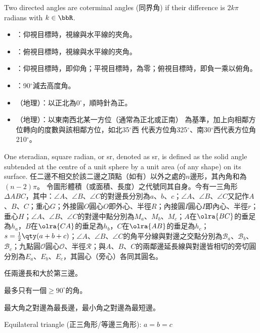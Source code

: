 \documentclass[a4paper,12pt]{report}
\begin{document}
Two directed angles are coterminal angles (同界角) if their difference is $2k\pi$ radians with $k\in\bbR$.
\begin{itemize}
\item {}：仰視目標時，視線與水平線的夾角。
\item {}：俯視目標時，視線與水平線的夾角。
\item {}：仰視目標時，即仰角；平視目標時，為零；俯視目標時，即負一乘以俯角。
\item {}：90$^{\circ}$減去高度角。
\item {}（地理）：以正北為0$^\circ$，順時針為正。
\item {}（地理）：以東南西北某一方位（通常為正北或正南） 為基準，加上向相鄰方位轉向的度數與該相鄰方位，如北35$^\circ$西 代表方位角325$^\circ$、南30$^\circ$西代表方位角210$^\circ$。
\end{itemize}
One steradian, square radian, or sr, denoted as sr, is defined as the solid angle subtended at the centre of a unit sphere by a unit area (of any shape) on its surface.
任二邊不相交於該二邊之頂點（如有）以外之處的$n$邊形，其內角和為$(n-2)\pi$。
令圖形體積（或面積、長度）之代號同其自身。今有一三角形$\Delta ABC$，其中：$\angle A$、$\angle B$、$\angle C$的對邊長分別為$a$、$b$、$c$；$\angle A$、$\angle B$、$\angle C$又記作$A$、$B$、$C$；重心$G$；外接圓$O$圓心$O$即外心、半徑$R$；內接圓$I$圓心$I$即內心、半徑$r$；垂心$H$；$\angle A$、$\angle B$、$\angle C$的對邊中點分別為$M_a$、$M_b$、$M_c$；$A$在$\olra{BC}$的垂足為$h_a$，$B$在$\olra{CA}$的垂足為$h_b$，$C$在$\olra{AB}$的垂足為$h_c$；$s=\frac{1}{2}\qty(a+b+c)$；$\angle A$、$\angle B$、$\angle C$的角平分線與對邊之交點分別為$\mathscr{B}_a$、$\mathscr{B}_b$、$\mathscr{B}_c$；九點圓$\mathscr{O}$圓心$\mathscr{O}$、半徑$\mathscr{R}$；與$A$、$B$、$C$的兩鄰邊延長線與對邊皆相切的旁切圓分別為$E_a$、$E_b$、$E_c$，其圓心（旁心）各同其圓名。
\bit
\item 任兩邊長和大於第三邊。
\item 最多只有一個$\geq 90^\circ$的角。
\item 最大角之對邊為最長邊，最小角之對邊為最短邊。
\eit
{}
\bit
\item Equilateral triangle (正三角形/等邊三角形): $a=b=c$
\end{document}

